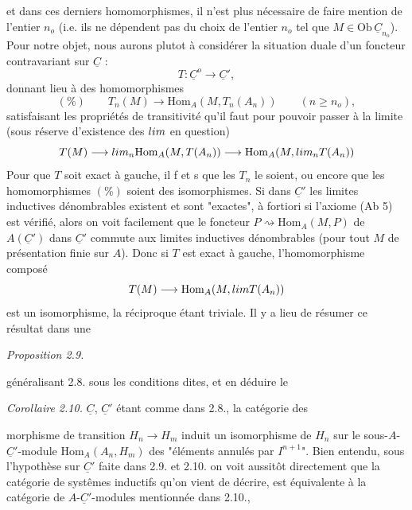 \documentclass[11pt,a4paper]{article}
\begin{document}
et dans ces derniers homomorphismes, il n'est plus nécessaire de faire mention de l'entier $n_o$ (i.e. ils ne dépendent pas du choix de l'entier $n_o$ tel que $M \in \mathrm{Ob}\,\underline{C}_{n_o}$). Pour notre objet, nous aurons plutot à considérer la situation duale d'un foncteur contravariant sur $\underline{C}$ :
\[
  T : \underline{C}^{o} \longrightarrow \underline{C}' ,
\]
donnant lieu à des homomorphismes
\[
  (\%) \qquad T_n(M) \longrightarrow \mathrm{Hom}_A(M, T_n(A_n)) \qquad (n \geqslant n_o) ,
\]
satisfaisant les propriétés de transitivité qu'il faut pour pouvoir passer à la limite (sous réserve d'existence des $\varinjlim$ en question)
\[
  T(M) \longrightarrow \varinjlim_n \mathrm{Hom}_A(M, T(A_n)) \longrightarrow \mathrm{Hom}_A\!\left(M, \varinjlim_n T(A_n)\right)
\]
Pour que $T$ soit exact à gauche, il f et s que les $T_n$ le soient, ou encore que les homomorphismes $(\%)$ soient des isomorphismes. Si dans $\underline{C}'$ les limites inductives   dénombrables existent et sont "exactes", à fortiori si l'axiome (Ab 5) est vérifié, alors   on voit facilement que le foncteur $P \rightsquigarrow \mathrm{Hom}_A(M,P)$ de  $A(\underline{C}')$ dans $\underline{C}'$ commute aux limites inductives  dénombrables (pour tout $M$ de présentation finie sur $A$). Donc  si  $T$ est exact à gauche, l'homomorphisme composé
\[
  T(M) \longrightarrow \mathrm{Hom}_A\!\left(M, \varinjlim T(A_n)\right)
\]
est un isomorphisme, la réciproque étant triviale. Il y a lieu de résumer ce résultat dans une

\emph{Proposition 2.9.}


généralisant 2.8. sous les conditions dites, et en déduire le

\emph{Corollaire 2.10.}  $\underline{C}$, $\underline{C}'$ étant comme dans 2.8., la catégorie des

morphisme de transition $H_n \to H_m$ induit un isomorphisme de $H_n$ sur le sous-$A$-$\underline{C}'$-module $\mathrm{Hom}_A(A_n, H_m)$ des "éléments annulés par $I^{n+1}$". Bien entendu, sous l'hypothèse sur $\underline{C}'$ faite dans 2.9. et 2.10. on voit aussitôt directement que la catégorie de systêmes inductifs qu'on vient de décrire, est équivalente à \struck{\ill{}} la catégorie de $A$-$\underline{C}'$-modules mentionnée dans 2.10., 
\end{document}
